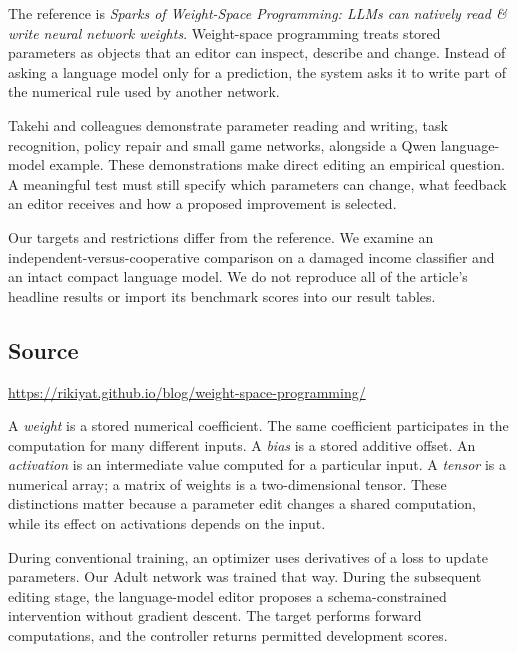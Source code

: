 The reference is \emph{Sparks of Weight-Space Programming: LLMs can natively read \& write neural network weights}. Weight-space programming treats stored parameters as objects that an editor can inspect, describe and change. Instead of asking a language model only for a prediction, the system asks it to write part of the numerical rule used by another network.

Takehi and colleagues demonstrate parameter reading and writing, task recognition, policy repair and small game networks, alongside a Qwen language-model example. These demonstrations make direct editing an empirical question. A meaningful test must still specify which parameters can change, what feedback an editor receives and how a proposed improvement is selected.

Our targets and restrictions differ from the reference. We examine an independent-versus-cooperative comparison on a damaged income classifier and an intact compact language model. We do not reproduce all of the article's headline results or import its benchmark scores into our result tables.

\subsection*{Source}
\url{https://rikiyat.github.io/blog/weight-space-programming/}

A \emph{weight} is a stored numerical coefficient. The same coefficient participates in the computation for many different inputs. A \emph{bias} is a stored additive offset. An \emph{activation} is an intermediate value computed for a particular input. A \emph{tensor} is a numerical array; a matrix of weights is a two-dimensional tensor. These distinctions matter because a parameter edit changes a shared computation, while its effect on activations depends on the input.

During conventional training, an optimizer uses derivatives of a loss to update parameters. Our Adult network was trained that way. During the subsequent editing stage, the language-model editor proposes a schema-constrained intervention without gradient descent. The target performs forward computations, and the controller returns permitted development scores.


